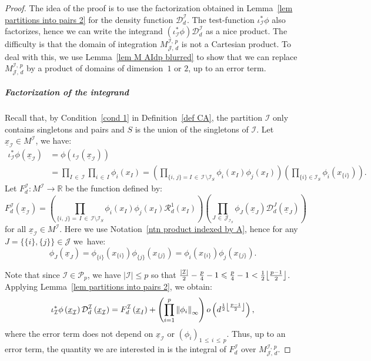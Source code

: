 \documentclass[10pt]{amsart}
\theoremstyle{definition}\newtheorem{defi}[theo]{Definition}\newtheorem{rema}[theo]{Remark}\newtheorem{exam}[theo]{Example}\newtheorem{exem}[theo]{Example}\newtheorem{nota}[theo]{Notation}
\DeclarePairedDelimiter{\floor}{\lfloor}{\rfloor}
\newcommand{\D}{\mathcal{D}}
\newcommand{\I}{\mathcal{I}}
\newcommand{\J}{\mathcal{J}}
\newcommand{\clR}{\mathcal{R}}
\newcommand{\pa}{\mathcal{P}\!}
\newcommand{\R}{\mathbb{R}}
\newcommand{\Norm}[1]{\left\lVert #1 \right\rVert}
\renewcommand{\leq}{\leqslant}
\begin{document}
\begin{proof}
The idea of the proof is to use the factorization obtained in Lemma~\ref{lem partitions into pairs 2} for the density function $\D^\I_d$. The test-function $\iota_\I^*\phi$ also factorizes, hence we can write the integrand $(\iota_\I^*\phi) \D^\I_d$ as a nice product. The difficulty is that the domain of integration $M^{\I,\,p}_{\J,\,d}$ is not a Cartesian product. To deal with this, we use Lemma~\ref{lem M AIdp blurred} to show that we can replace $M^{\I,\,p}_{\J,\,d}$ by a product of domains of dimension~$1$ or $2$, up to an error term.

\subparagraph*{Factorization of the integrand}
Recall that, by Condition~\eqref{cond 1} in Definition~\ref{def CA}, the partition $\I$ only contains singletons and pairs and $S$ is the union of the singletons of $\I$. Let $\underline{x}_\I \in M^\I$, we have:
\begin{align*}
\iota_\I^*\phi\left(\underline{x}_\I\right) &= \phi\left(\iota_\I\left(\underline{x}_\I\right)\right)\\
&= \prod_{I\,\in\,\I} \prod_{i\,\in\,I} \phi_i(x_I) = \left(\prod_{\{i,\,j\}=I\,\in\, \I\,\setminus \I_S} \phi_i(x_I)\phi_j(x_I)\right) \left(\prod_{\{i\} \in \I_S} \phi_i\left(x_{\{i\}}\right)\right).
\end{align*}
Let $F_d^\I: M^\I \to \R$ be the function defined by:
\begin{equation}\label{eq def FId}
F_d^\I(\underline{x}_\I) = \left(\prod_{\{i,\,j\}=\,I\,\in\,\I \setminus \I_S} \phi_i(x_I)\phi_j(x_I)\clR^1_d(x_I)\right)\left(\prod_{J\,\in\,\J_{\I_S}} \phi_J\left(\underline{x}_J\right)\D_d^J\left(\underline{x}_J\right)\right)
\end{equation}
for all $\underline{x}_\I \in M^\I$. Here we use Notation~\ref{ntn product indexed by A}, hence for any $J = \{\{i\},\{j\}\} \in \J$ we~have:
\[
\phi_J\left(\underline{x}_J\right) = \phi_{\{i\}}\left(x_{\{i\}}\right)\phi_{\{j\}}\left(x_{\{j\}}\right) = \phi_i\left(x_{\{i\}}\right)\phi_j\left(x_{\{j\}}\right).
\]

Note that since $\I \in \pa_p$, we have $|\I| \leq p$ so that $\frac{|\I|}{2}-\frac{p}{4}-1 \leq \frac{p}{4}-1 < \frac{1}{2}\floor*{\frac{p-1}{2}}$. Applying Lemma~\ref{lem partitions into pairs 2}, we obtain:
\begin{equation}\label{eq leading term}
\iota_\I^*\phi\left(\underline{x}_\I\right) \D^\I_d\left(\underline{x}_\I\right) = F_d^\I\left(\underline{x}_I\right)+\left(\prod_{i=1}^p \Norm{\phi_i}_\infty\right) o\left(d^{\frac{1}{2}\floor*{\frac{p-1}{2}}}\right),
\end{equation}
where the error term does not depend on $\underline{x}_\I$ or $(\phi_i)_{1\,\leq\,i\,\leq\,p}$. Thus, up to an error term, the quantity we are interested in is the integral of $F_d^\I$ over $M^{\I,\,p}_{\J,\,d}$.


\end{proof}
\end{document}
